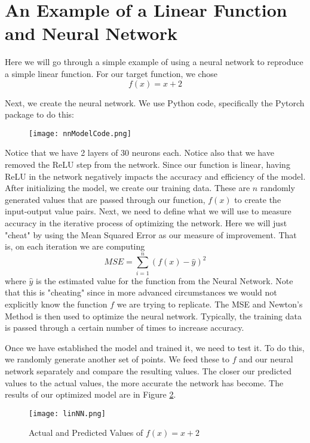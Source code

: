\documentclass{report}
\begin{document}
\section{An Example of a Linear Function and Neural Network}

Here we will go through a simple example of using a neural network to reproduce a simple linear function.
For our target function, we chose 
\begin{equation}
f(x) = x + 2
\end{equation}

Next, we create the neural network. We use Python code, specifically the Pytorch package to do this:

\begin{figure}[H]
\texttt{[image: nnModelCode.png]}
\label{nnCode}
\end{figure}

Notice that we have 2 layers of 30 neurons each. Notice also that we have removed the ReLU step from the network. Since our function is linear, having ReLU in the network negatively impacts the accuracy and efficiency of the model. After initializing the model, we create our training data. These are $n$ randomly generated values that are passed through our function, $f(x)$ to create the input-output value pairs. Next, we need to define what we will use to measure accuracy in the iterative process of optimizing the network. Here we will just "cheat" by using the Mean Squared Error as our measure of improvement. That is, on each iteration we are computing
$$MSE =  \sum_{i=1}^n (f(x)-\hat{y})^2$$
where $\hat{y}$ is the estimated value for the function from the Neural Network. Note that this is "cheating" since in more advanced circumstances we would not explicitly know the function $f$ we are trying to replicate. The MSE and Newton's Method is then used to optimize the neural network. Typically, the training data is passed through a certain number of times to increase accuracy.

Once we have established the model and trained it, we need to test it. To do this, we randomly generate another set of points. We feed these to $f$ and our neural network separately and compare the resulting values. The closer our predicted values to the actual values, the more accurate the network has become. The results of our optimized model are in Figure \ref{fig:linNN}.

\begin{figure}[H]
\centering
\texttt{[image: linNN.png]}
\centering
\caption{Actual and Predicted Values of $f(x) = x+2$}
\label{fig:linNN}
\centering
\end{figure}
\end{document}
